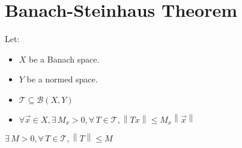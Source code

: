 \documentclass[letterpaper,12pt,fleqn]{article}
\newcommand{\B}{\mathcal{B}}
\newcommand{\T}{\mathcal{T}}
\newcommand{\norm}[1]{\left\|#1\right\|}
\newcommand{\vx}{\vec{x}}
\begin{document}
\section*{Banach-Steinhaus Theorem}

\begin{theorem}
  Let:
  \begin{itemize}
  \item $X$ be a Banach space.
  \item $Y$ be a normed space.
  \item $\T\subseteq\B(X,Y)$
  \item $\forall\vx\in X,\exists\,M_x>0,\forall\,T\in\T,\norm{Tx}\le
    M_x\norm{\vx}$
  \end{itemize}
  $\exists\,M>0,\forall\,T\in\T,\norm{T}\le M$
\end{theorem}
\end{document}

